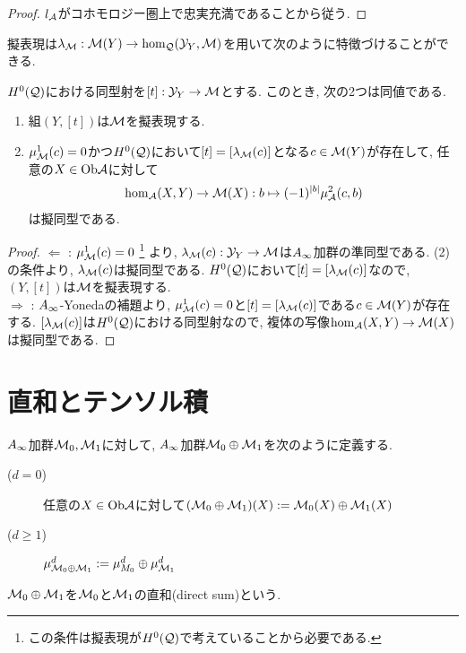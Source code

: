 \documentclass[uplatex, a4paper, 14Q, dvipdfmx]{jsarticle}
\begin{document}
\begin{proof}
  $l_{\mathcal{A}}$がコホモロジー圏上で忠実充満であることから従う. 
\end{proof}

擬表現は$\lambda_{\mathcal{M}} : \mathcal{M}(Y) \to \hom_{\mathcal{Q}}(\mathcal{Y}_Y,\mathcal{M})$を用いて次のように特徴づけることができる. 

\begin{lemma}
  $H^0(\mathcal{Q})$における同型射を$[t] : \mathcal{Y}_Y \to \mathcal{M}$とする. 
  このとき, 次の2つは同値である. 
  \begin{enumerate}
    \item 組$(Y,[t])$は$\mathcal{M}$を擬表現する.
    \item $\mu^1_{\mathcal{M}}(c)=0$かつ$H^0(\mathcal{Q})$において$[t]=[\lambda_{\mathcal{M}}(c)]$となる$c \in \mathcal{M}(Y)$が存在して, 任意の$X \in \mathrm{Ob}\mathcal{A}$に対して
    \begin{align*}
      \hom_{\mathcal{A}}(X,Y) \to \mathcal{M}(X) : b \mapsto (-1)^{|b|} \mu^2_{\mathcal{A}}(c,b)
    \end{align*}
    は擬同型である. 
  \end{enumerate}
\end{lemma}

\begin{proof}
  $\Leftarrow$ : $\mu^1_{\mathcal{M}}(c)=0$
  \footnote{
    この条件は擬表現が$H^0(\mathcal{Q})$で考えていることから必要である.
  }
  より, $\lambda_{\mathcal{M}}(c) : \mathcal{Y}_Y \to \mathcal{M}$は$A_{\infty}$加群の準同型である.
  (2)の条件より, $\lambda_{\mathcal{M}}(c)$は擬同型である. 
  $H^0(\mathcal{Q})$において$[t]=[\lambda_{\mathcal{M}}(c)]$なので, $(Y,[t])$は$\mathcal{M}$を擬表現する. \\
  $\Rightarrow$ : $A_{\infty}$-Yonedaの補題より, $\mu^1_{\mathcal{M}}(c)=0$と$[t]=[\lambda_{\mathcal{M}}(c)]$である$c \in \mathcal{M}(Y)$が存在する.
  $[\lambda_{\mathcal{M}}(c)]$は$H^0(\mathcal{Q})$における同型射なので, 複体の写像$\hom_{\mathcal{A}}(X,Y) \to \mathcal{M}(X)$は擬同型である. 
\end{proof}

\section{直和とテンソル積}

\begin{definition}[直和]
  $A_{\infty}$加群$\mathcal{M}_0,\mathcal{M}_1$に対して, $A_{\infty}$加群$\mathcal{M}_0 \oplus \mathcal{M}_1$を次のように定義する. 
  \begin{description}
    \item[($d=0$)] 任意の$X \in \mathrm{Ob}\mathcal{A}$に対して$(\mathcal{M}_0 \oplus \mathcal{M}_1)(X) := \mathcal{M}_0(X) \oplus \mathcal{M}_1(X)$
    \item[($d \geq 1$)] $\mu^d_{\mathcal{M}_0 \oplus \mathcal{M}_1} := \mu^d_{M_0} \oplus \mu^d_{\mathcal{M}_1}$
  \end{description} 
  $\mathcal{M}_0 \oplus \mathcal{M}_1$を$\mathcal{M}_0$と$\mathcal{M}_1$の直和(direct sum)という. 
\end{definition}
\end{document}
